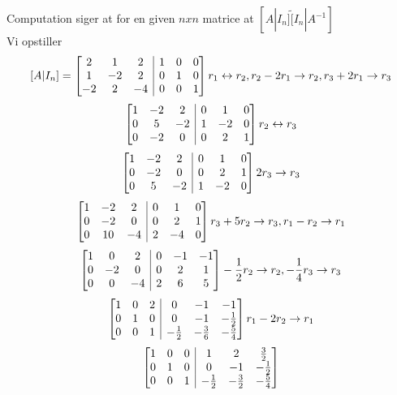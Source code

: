 \documentclass[a4paper,fleqn]{article}
\begin{document}
	Computation siger at for en given $n x n$ matrice at $[A | I_n] \tilde [I_n | A^{-1}]$\\
	Vi opstiller
	\[ [A|I_n] = \left[\begin{array}{@{}ccc|ccc@{}}
			2	&	1	&	2	&	1	&	0	&	0\\
			1	&	-2	&	2	&	0	&	1	&	0\\
			-2	&	2	&	-4	&	0	&	0	&	1\\
	\end{array}\right] r_1 \leftrightarrow r_2, r_2 - 2r_1 \rightarrow r_2, r_3 + 2r_1 \rightarrow r_3\]
	\[  \left[\begin{array}{@{}ccc|ccc@{}}
			1	&	-2	&	2	&	0	&	1	&	0\\
			0	&	5	&	-2	&	1	&	-2	&	0\\
			0	&	-2	&	0	&	0	&	2	&	1\\
	\end{array}\right] r_2 \leftrightarrow r_3 \]
	\[  \left[\begin{array}{@{}ccc|ccc@{}}
			1	&	-2	&	2	&	0	&	1	&	0\\
			0	&	-2	&	0	&	0	&	2	&	1\\
			0	&	5	&	-2	&	1	&	-2	&	0\\
	\end{array}\right]  2r_3 \rightarrow r_3 \]
	\[  \left[\begin{array}{@{}ccc|ccc@{}}
			1	&	-2	&	2	&	0	&	1	&	0\\
			0	&	-2	&	0	&	0	&	2	&	1\\
			0	&	10	&	-4	&	2	&	-4	&	0\\
	\end{array}\right] r_3 + 5r_2 \rightarrow r_3, r_1 - r_2 \rightarrow r_1\]
	\[  \left[\begin{array}{@{}ccc|ccc@{}}
			1	&	0	&	2	&	0	&	-1	&	-1\\
			0	&	-2	&	0	&	0	&	2	&	1\\
			0	&	0	&	-4	&	2	&	6	&	5\\
	\end{array}\right] -\frac{1}{2}r_2 \rightarrow r_2, -\frac{1}{4}r_3 \rightarrow r_3\]
	\[  \left[\begin{array}{@{}ccc|ccc@{}}
			1	&	0	&	2	&	0	&	-1	&	-1\\
			0	&	1	&	0	&	0	&	-1	&	-\frac{1}{2}\\
			0	&	0	&	1	&	-\frac{1}{2}&	-\frac{3}{6}	& -\frac{5}{4}\\
	\end{array}\right] r_1 - 2r_2 \rightarrow r_1 \]
	\[  \left[\begin{array}{@{}ccc|ccc@{}}
			1	&	0	&	0	&	1	&	2	&	\frac{3}{2}\\
			0	&	1	&	0	&	0	&	-1	&	-\frac{1}{2}\\
			0	&	0	&	1	&	-\frac{1}{2}&	-\frac{3}{2}	& -\frac{5}{4}\\
	\end{array}\right]\]
\end{document}
